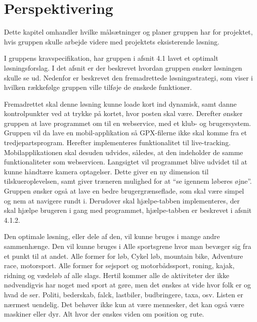 \chapter{Perspektivering}
Dette kapitel omhandler hvilke målsætninger og planer gruppen har for projektet, hvis gruppen skulle arbejde videre med projektets eksisterende løsning.

I gruppens kravspecifikation, har gruppen i afsnit 4.1 lavet et optimalt løsningsforslag. I det afsnit er der beskrevet hvordan gruppen ønsker løsningen skulle se ud. Nedenfor er beskrevet den fremadrettede løsningsstrategi, som viser i hvilken rækkefølge gruppen ville tilføje de ønskede funktioner.

Fremadrettet skal denne løsning kunne loade kort ind dynamisk, samt danne kontrolpunkter ved at trykke på kortet, hvor posten skal være. Derefter ønsker gruppen at lave programmet om til en webservice, med et klub- og brugersystem. \newline
Gruppen vil da lave en mobil-applikation så GPX-filerne ikke skal komme fra et tredjepartsprogram. Herefter implementeres funktionalitet til live-tracking.  Mobilapplikationen skal desuden udvides, således, at den indeholder de samme funktionaliteter som webservicen. Langsigtet vil programmet blive udvidet til at kunne håndtære kamera optagelser. Dette giver en ny dimension til tilskueroplevelsen, samt giver træneren mulighed for at “se igennem løberes øjne”. \newline
Gruppen ønsker også at lave en bedre brugergrænseflade, som skal være simpel og nem at navigere rundt i. Derudover skal hjælpe-tabben implementeres, der skal hjælpe brugeren i gang med programmet, hjælpe-tabben er beskrevet i afsnit 4.1.2. 

Den optimale løsning, eller dele af den, vil kunne bruges i mange andre sammenhænge. Den vil kunne bruges i Alle sportsgrene hvor man bevæger sig fra et punkt til at andet. Alle former for løb, Cykel løb, mountain bike, Adventure race, motorsport. Alle former for sejsport og motorbådssport, roning, kajak, ridning og vædeløb af alle slags. Hertil kommer alle de aktiviteter der ikke nødvendigvis har noget med sport at gøre, men det ønskes at vide hvor folk er og hvad de ser. Politi, bederskab, falck, lastbiler, budbringere, taxa, osv. Listen er nærmest uendelig. Det behøver ikke kun at være mennesker, det kan også være maskiner eller dyr. Alt hvor der ønskes viden om position og rute.
